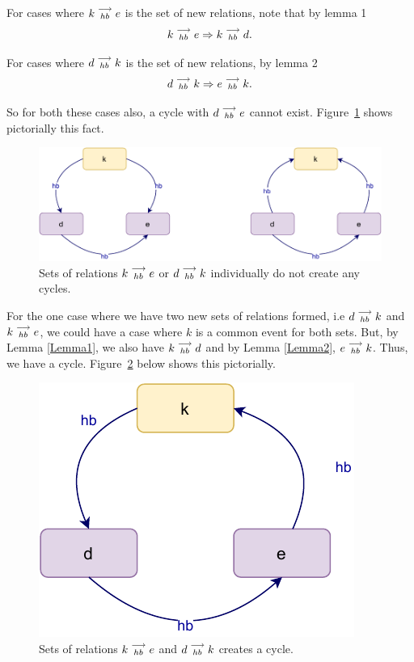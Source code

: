     For cases where $k\stackrel{\longrightarrow}{_{hb}}e$ is the set of new relations, note that by lemma 1
    \[
        k\stackrel{\longrightarrow}{_{hb}}e \Rightarrow k\stackrel{\longrightarrow}{_{hb}}d.
    \]

    For cases where $d\stackrel{\longrightarrow}{_{hb}}k$ is the set of new relations, by lemma 2
    \[
        d\stackrel{\longrightarrow}{_{hb}}k \Rightarrow e\stackrel{\longrightarrow}{_{hb}}k.
    \]

    So for both these cases also, a cycle with $d\stackrel{\longrightarrow}{_{hb}}e$ cannot exist. 
    Figure~\ref{reord:cycle(b)} shows pictorially this fact. 
    \begin{figure}[H]
        \centering
        \includegraphics[scale=0.7]{5.InstructionReordering/4.ValidReorderingCandidate/ProofParts/Part3/part3(c).pdf}
        \caption{Sets of relations $k\stackrel{\longrightarrow}{_{hb}}e$ or $d\stackrel{\longrightarrow}{_{hb}}k$ individually do not create any cycles.}
        \label{reord:cycle(b)}
    \end{figure}

    For the one case where we have two new sets of relations formed, i.e $d\stackrel{\longrightarrow}{_{hb}}k$ and $k\stackrel{\longrightarrow}{_{hb}}e$, we could have a case where $k$ is a common event for both sets. 
    But, by Lemma \ref{Lemma1}, we also have $k\stackrel{\longrightarrow}{_{hb}}d$ and by Lemma \ref{Lemma2}, $e\stackrel{\longrightarrow}{_{hb}}k$\footnotemark. 
    Thus, we have a cycle. 
    Figure~\ref{reord:cycle(c)} below shows this pictorially.
    \begin{figure}[H]
        \centering
        \includegraphics[scale=0.7]{5.InstructionReordering/4.ValidReorderingCandidate/ProofParts/Part3/part3(d).pdf}
        \caption{Sets of relations $k\stackrel{\longrightarrow}{_{hb}}e$ and $d\stackrel{\longrightarrow}{_{hb}}k$ creates a cycle.}
        \label{reord:cycle(c)}
    \end{figure}


